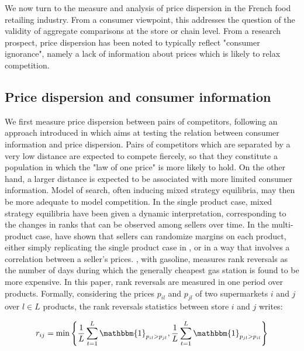 \documentclass[english]{article}
\begin{document}
We now turn to the measure and analysis of price dispersion in the French food retailing industry. From a consumer viewpoint, this addresses the question of the validity of aggregate comparisons at the store or chain level. From a research prospect, price dispersion has been noted to typically reflect "consumer ignorance", namely a lack of information about prices which is likely to relax competition.

\subsection{Price dispersion and consumer information}

We first measure price dispersion between pairs of competitors, following an approach introduced in \cite{TAP11} which aims at testing the relation between consumer information and price dispersion. Pairs of competitors which are separated by a very low distance are expected to compete fiercely, so that they constitute a population in which the "law of one price" is more likely to hold. On the other hand, a larger distance is expected to be associated with more limited consumer information. Model of search, often inducing mixed strategy equilibria, may then be more adequate to model competition. In the single product case, mixed strategy equilibria have been given a dynamic interpretation, corresponding to the changes in ranks that can be observed among sellers over time. In the multi-product case, \cite{MCA95} have shown that sellers can randomize margins on each product, either simply replicating the single product case in \cite{VAR80}, or in a way that involves a correlation between a seller's prices. \cite{TAP11}, with gasoline, measures rank reversals as the number of days during which the generally cheapest gas station is found to be more expensive. In this paper, rank reversals are measured in one period over products. Formally, considering the prices $p_{il}$ and $p_{jl}$ of two supermarkets $i$ and $j$ over $l \in L$ products, the rank reversals statistics between store $i$ and $j$ writes:

\begin{align}
r_{ij} = \min\left\{\frac{1}{L} \sum_{t=1}^{L} \mathbbm{1}_{p_{il} > p_{jl}}, \frac{1}{L} \sum_{t=1}^{L} \mathbbm{1}_{p_{jl} > p_{il}}\right\}
\label{formula_rr_static}
\end{align}

\end{document}
